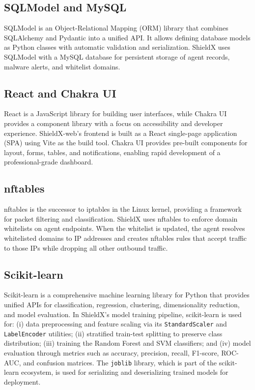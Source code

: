 \documentclass[../Main.tex]{subfiles}
\begin{document}
\subsection{SQLModel and MySQL}

SQLModel \cite{sqlmodel} is an Object-Relational Mapping (ORM) library that combines SQLAlchemy and Pydantic into a unified API. It allows defining database models as Python classes with automatic validation and serialization. ShieldX uses SQLModel with a MySQL database for persistent storage of agent records, malware alerts, and whitelist domains.

\subsection{React and Chakra UI}

React is a JavaScript library for building user interfaces, while Chakra UI provides a component library with a focus on accessibility and developer experience. ShieldX-web's frontend is built as a React single-page application (SPA) using Vite as the build tool. Chakra UI provides pre-built components for layout, forms, tables, and notifications, enabling rapid development of a professional-grade dashboard.

\subsection{nftables}

nftables is the successor to iptables in the Linux kernel, providing a framework for packet filtering and classification. ShieldX uses nftables to enforce domain whitelists on agent endpoints. When the whitelist is updated, the agent resolves whitelisted domains to IP addresses and creates nftables rules that accept traffic to those IPs while dropping all other outbound traffic.

\subsection{Scikit-learn}

Scikit-learn \cite{scikit-learn} is a comprehensive machine learning library for Python that provides unified APIs for classification, regression, clustering, dimensionality reduction, and model evaluation. In ShieldX's model training pipeline, scikit-learn is used for: (i) data preprocessing and feature scaling via its \texttt{StandardScaler} and \texttt{LabelEncoder} utilities; (ii) stratified train-test splitting to preserve class distribution; (iii) training the Random Forest and SVM classifiers; and (iv) model evaluation through metrics such as accuracy, precision, recall, F1-score, ROC-AUC, and confusion matrices. The \texttt{joblib} library, which is part of the scikit-learn ecosystem, is used for serializing and deserializing trained models for deployment.
\end{document}
